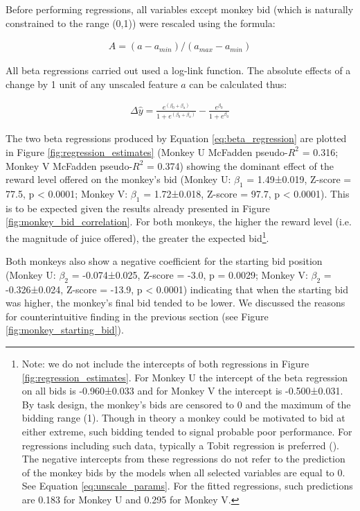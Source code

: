 Before performing regressions, all variables except monkey bid (which is naturally constrained to the range (0,1)) were rescaled using the formula:

\begin{align}
A = (a - a_{min}) / (a_{max} - a_{min})
\label{eq:rescaling_params}
\end{align}

All beta regressions carried out used a log-link function. The absolute effects of a change by 1 unit of any unscaled feature $a$ can be calculated thus:

\begin{align}
\Delta\hat{y} = \frac{e^{(\beta_0 + \beta_a)}}{1 + e^{(\beta_0 + \beta_a)}} - \frac{e^{\beta_0}}{1 + e^{\beta_0}}
\label{eq:unscale_params}
\end{align}

The two beta regressions produced by Equation \ref{eq:beta_regression} are plotted in Figure \ref{fig:regression_estimates} (Monkey U McFadden pseudo-$R^2$ = 0.316; Monkey V McFadden pseudo-$R^2$ = 0.374) showing the dominant effect of the reward level offered on the monkey’s bid (Monkey U: $\beta_1$ = 1.49±0.019, Z-score = 77.5, p < 0.0001; Monkey V: $\beta_1$ = 1.72±0.018, Z-score = 97.7, p < 0.0001). This is to be expected given the results already presented in Figure \ref{fig:monkey_bid_correlation}. For both monkeys, the higher the reward level (i.e. the magnitude of juice offered), the greater the expected bid\footnote{Note: we do not include the intercepts of both regressions in Figure \ref{fig:regression_estimates}. For Monkey U the intercept of the beta regression on all bids is -0.960±0.033 and for Monkey V the intercept is -0.500±0.031. By task design, the monkey’s bids are censored to 0 and the maximum of the bidding range (1). Though in theory a monkey could be motivated to bid at either extreme, such bidding tended to signal probable poor performance. For regressions including such data, typically a Tobit regression is preferred (\cite{tobinEstimationRelationshipsLimited1958}). The negative intercepts from these regressions do not refer to the prediction of the monkey bids by the models when all selected variables are equal to 0. See Equation \ref{eq:unscale_params}. For the fitted regressions, such predictions are 0.183 for Monkey U and 0.295 for Monkey V.}.

Both monkeys also show a negative coefficient for the starting bid position (Monkey U: $\beta_2$ = -0.074±0.025, Z-score = -3.0, p = 0.0029; Monkey V: $\beta_2$ = -0.326±0.024, Z-score = -13.9, p < 0.0001) indicating that when the starting bid was higher, the monkey’s final bid tended to be lower. We discussed the reasons for counterintuitive finding in the previous section (see Figure \ref{fig:monkey_starting_bid}).

